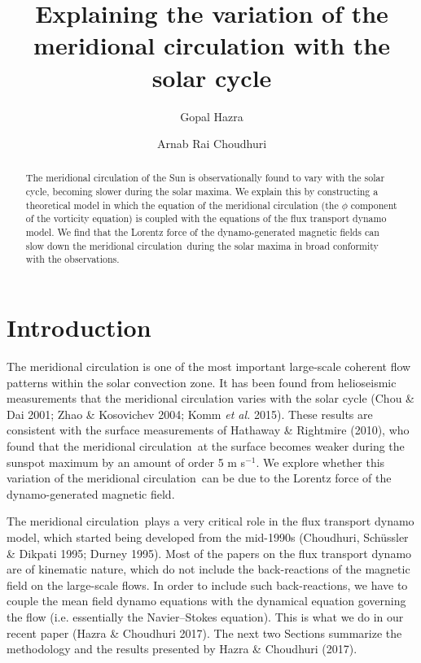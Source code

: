 \documentclass{iau}
\title[Variation of Meridional Circulation with solar cycle] %
{Explaining the variation of the meridional circulation with the solar cycle}
\author[Hazra \& Choudhuri]   %
{Gopal Hazra
 \and Arnab Rai Choudhuri}
\affiliation{Dept. of Physics, Indian Institute of Science, \\Bangalore - 560012,
India \\ email: {\tt hgopal, arnab@iisc.ac.in}}
\def\MC{meridional circulation}
\begin{document}
\maketitle

\begin{abstract}
The meridional circulation of the Sun is observationally found to vary with the solar cycle, becoming
slower during the solar maxima. We explain this by 
constructing a theoretical model in which
the equation of the meridional circulation (the $\phi$ component of the vorticity equation) 
is coupled with the equations of the flux transport dynamo model. We
find that the Lorentz force of the dynamo-generated magnetic fields can slow down the \MC\ during
the solar maxima in broad conformity with the observations.

\end{abstract}

\firstsection
\section{Introduction}
The meridional circulation is one of the most important large-scale coherent flow
patterns within the solar convection zone. 
It has been found from helioseismic measurements that the
meridional circulation varies with the solar cycle
(Chou \& Dai 2001; Zhao \& Kosovichev 2004; Komm {\em et al.} 2015). These results are consistent with
the surface measurements of Hathaway \& Rightmire (2010),
who found that the \MC\ at the surface becomes weaker during the sunspot
maximum by an amount of order 5 m s$^{-1}$. We explore whether this
variation of the \MC\ can be due to the Lorentz force 
of the dynamo-generated magnetic field.

The \MC\ plays a very critical role in the flux transport dynamo
model, which started being developed from the mid-1990s (Choudhuri, Sch\"ussler
\& Dikpati 1995; Durney 1995). Most of the papers on the flux transport dynamo are of kinematic
nature, which do not include the back-reactions of the magnetic field
on the large-scale flows. In order to include such back-reactions, we have
to couple the mean field dynamo equations with the dynamical equation governing
the flow (i.e. essentially the Navier--Stokes equation). This is what we do in our
recent paper (Hazra \& Choudhuri 2017). The next two Sections summarize the
methodology and the results presented by Hazra \& Choudhuri (2017).
\end{document}
